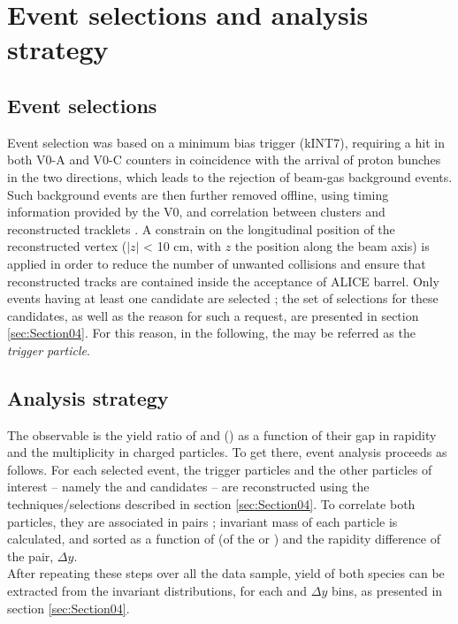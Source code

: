 \newpage
\section{Event selections and analysis strategy}
\label{sec:Section03}

\subsection{Event selections}

Event selection was based on a minimum bias trigger (kINT7), requiring a hit in both V0-A and V0-C counters in coincidence with the arrival of proton bunches in the two directions, which leads to the rejection of beam-gas background events. Such background events are then further removed offline, using timing information provided by the V0, and correlation between clusters and reconstructed tracklets \cite{alice_collaboration_performance_2014}. A constrain on the longitudinal position of the reconstructed vertex ($|z|$ < 10 cm, with $z$ the position along the beam axis) is applied in order to reduce the number of unwanted collisions and ensure that reconstructed tracks are contained inside the acceptance of ALICE barrel. Only events having at least one \rmOmegaPM candidate are selected ; the set of selections for these candidates, as well as the reason for such a request, are presented in section \ref{sec:Section04}. For this reason, in the following, the \rmOmegaPM may be referred as the \textit{trigger particle}.

\subsection{Analysis strategy}

The observable is the yield ratio of \rmPhiMes and (\rmOmegas) as a function of their gap in rapidity and the multiplicity in charged particles. To get there, event analysis proceeds as follows. For each selected event, the trigger particles and the other particles of interest -- namely the \rmOmegaPM and \rmPhiMes candidates -- are reconstructed using the techniques/selections described in section \ref{sec:Section04}. To correlate both particles, they are associated in pairs ; invariant mass of each particle is calculated, and sorted as a function of \pT (of the \rmOmegaPM or \rmPhiMes) and the rapidity difference of the pair, $\Delta y$. \\
After repeating these steps over all the data sample, yield of both species can be extracted from the invariant distributions, for each \pT and $\Delta y$ bins, as presented in section \ref{sec:Section04}. 

